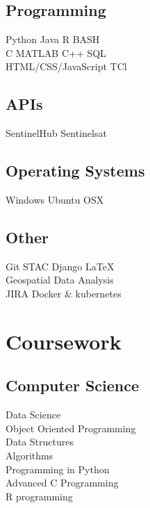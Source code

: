 \documentclass[letterpaper]{deedy-resume} %
\begin{document}
\begin{minipage}[t]{0.33\textwidth}
\subsection{Programming}

\textbullet{} Python \textbullet{} Java \textbullet{} R \textbullet{} BASH \\
\textbullet{} C \textbullet{} MATLAB \textbullet{} C++ \textbullet{} SQL \\ 
\textbullet{} HTML/CSS/JavaScript \textbullet{} TCl
\sectionspace

\subsection{APIs}

\textbullet{} SentinelHub \textbullet{} Sentinelsat
\sectionspace

\subsection{Operating Systems}
\textbullet{} Windows \textbullet{} Ubuntu \textbullet{} OSX
\sectionspace

\subsection{Other}
\textbullet{} Git \textbullet{} STAC \textbullet{} Django \textbullet{} \LaTeX \\ \textbullet{} Geospatial Data Analysis \\ 
\textbullet{} JIRA \textbullet{} Docker \& kubernetes



\sectionspace %


\section{Coursework}


\subsection{Computer Science}

\textbullet{} Data Science \\
\textbullet{} Object Oriented Programming \\
\textbullet{} Data Structures \\
\textbullet{} Algorithms \\
\textbullet{} Programming in Python \\
\textbullet{} Advanced C Programming \\
\textbullet{} R programming \\


\end{minipage}
\end{document}
